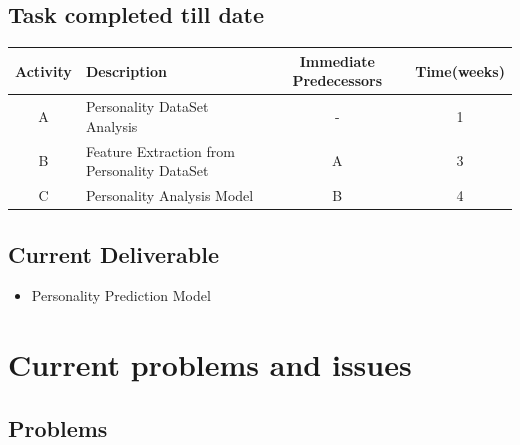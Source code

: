 \documentclass[a4paper, 12pt, onepage]{article}
\begin{document}
      \subsection{Task completed till date}
	\begin{center}
		\begin{tabular}{|c|l|c|c|}
			\hline
				Activity & Description & Immediate Predecessors&Time(weeks)\\
			\hline
			A&Personality DataSet Analysis&-&1\\
			\hline
			B&Feature Extraction from Personality DataSet&A&3\\
			\hline
			C&Personality Analysis Model&B&4\\
			\hline
		\end{tabular}
	\end{center}
	\subsection{Current Deliverable}
	\begin{itemize}
	\item Personality Prediction Model
	\end{itemize}


      \cleardoublepage
      \section{Current problems and issues}
      \subsection{Problems}
\end{document}
